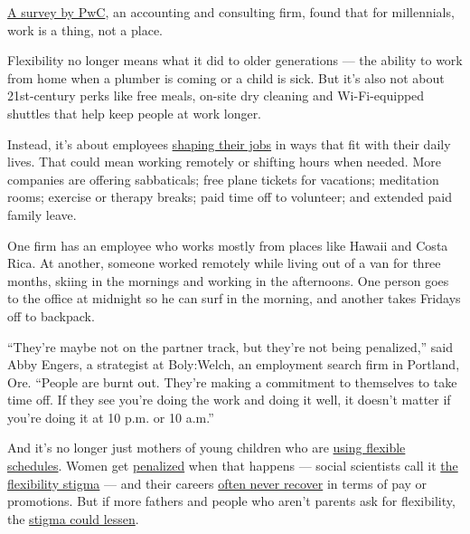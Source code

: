 \href{https://www.pwc.com/gx/en/hr-management-services/publications/assets/pwc-nextgen.pdf}{A
survey by PwC}, an accounting and consulting firm, found that for
millennials, work is a thing, not a place.

Flexibility no longer means what it did to older generations --- the
ability to work from home when a plumber is coming or a child is sick.
But it's also not about 21st-century perks like free meals, on-site dry
cleaning and Wi-Fi-equipped shuttles that help keep people at work
longer.

Instead, it's about employees
\href{https://www.sciencedirect.com/science/article/pii/S000187911930079X?via\%3Dihub\&_ga=2.20924735.68249205.1567371007-1130687845.1567371007}{shaping
their jobs} in ways that fit with their daily lives. That could mean
working remotely or shifting hours when needed. More companies are
offering sabbaticals; free plane tickets for vacations; meditation
rooms; exercise or therapy breaks; paid time off to volunteer; and
extended paid family leave.

One firm has an employee who works mostly from places like Hawaii and
Costa Rica. At another, someone worked remotely while living out of a
van for three months, skiing in the mornings and working in the
afternoons. One person goes to the office at midnight so he can surf in
the morning, and another takes Fridays off to backpack.

``They're maybe not on the partner track, but they're not being
penalized,'' said Abby Engers, a strategist at Boly:Welch, an employment
search firm in Portland, Ore. ``People are burnt out. They're making a
commitment to themselves to take time off. If they see you're doing the
work and doing it well, it doesn't matter if you're doing it at 10 p.m.
or 10 a.m.''

And it's no longer just mothers of young children who are
\href{https://onlinelibrary.wiley.com/doi/10.1111/soc4.12700}{using
flexible schedules}. Women get
\href{https://www.nytimes.com/2014/09/07/upshot/a-child-helps-your-career-if-youre-a-man.html}{penalized}
when that happens --- social scientists call it
\href{https://spssi.onlinelibrary.wiley.com/toc/15404560/69/2}{the
flexibility stigma} --- and their careers
\href{https://www.nytimes.com/2018/04/09/upshot/the-10-year-baby-window-that-is-the-key-to-the-womens-pay-gap.html}{often
never recover} in terms of pay or promotions. But if more fathers and
people who aren't parents ask for flexibility, the
\href{https://journals.sagepub.com/doi/full/10.1177/0731121418768235}{stigma
could lessen}.

